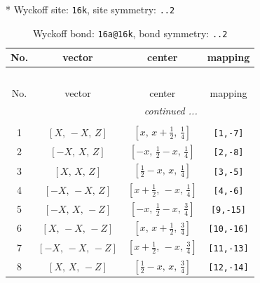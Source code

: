 \documentclass[fleqn,8pt]{jsarticle}
\begin{document}
* Wyckoff site: {\tt 16k}, site symmetry: {\tt ..2}
\renewcommand{\arraystretch}{1.2}
\begin{longtable}{cccc}
\caption{Wyckoff bond: {\tt 16a@16k}, bond symmetry: {\tt ..2}}
 \\
 \hline \hline
No. & vector & center & mapping \\ \hline \endfirsthead

\multicolumn{3}{l}{\tablename\ \thetable{}} \\
 \hline \hline
No. & vector & center & mapping \\ \hline \endhead

 \hline \hline
\multicolumn{3}{r}{\footnotesize\it continued ...} \\ \endfoot

 \hline \hline
\multicolumn{3}{r}{} \\ \endlastfoot

1 & $\left[ X,\, - X,\, Z \right]$ & $\left[ x,\, x + \frac{1}{2},\, \frac{1}{4} \right]$ & {\tt [1,-7]} \\ \hline
2 & $\left[ - X,\, X,\, Z \right]$ & $\left[ - x,\, \frac{1}{2} - x,\, \frac{1}{4} \right]$ & {\tt [2,-8]} \\ \hline
3 & $\left[ X,\, X,\, Z \right]$ & $\left[ \frac{1}{2} - x,\, x,\, \frac{1}{4} \right]$ & {\tt [3,-5]} \\ \hline
4 & $\left[ - X,\, - X,\, Z \right]$ & $\left[ x + \frac{1}{2},\, - x,\, \frac{1}{4} \right]$ & {\tt [4,-6]} \\ \hline
5 & $\left[ - X,\, X,\, - Z \right]$ & $\left[ - x,\, \frac{1}{2} - x,\, \frac{3}{4} \right]$ & {\tt [9,-15]} \\ \hline
6 & $\left[ X,\, - X,\, - Z \right]$ & $\left[ x,\, x + \frac{1}{2},\, \frac{3}{4} \right]$ & {\tt [10,-16]} \\ \hline
7 & $\left[ - X,\, - X,\, - Z \right]$ & $\left[ x + \frac{1}{2},\, - x,\, \frac{3}{4} \right]$ & {\tt [11,-13]} \\ \hline
8 & $\left[ X,\, X,\, - Z \right]$ & $\left[ \frac{1}{2} - x,\, x,\, \frac{3}{4} \right]$ & {\tt [12,-14]} \\
\end{longtable}
\renewcommand{\arraystretch}{1.2}
\end{document}
